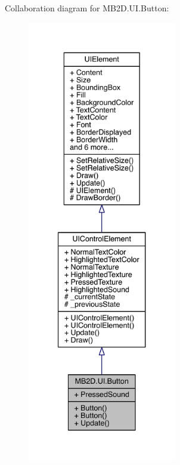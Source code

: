 Collaboration diagram for M\+B2\+D.\+U\+I.\+Button\+:\nopagebreak
\begin{figure}[H]
\begin{center}
\leavevmode
\includegraphics[height=550pt]{class_m_b2_d_1_1_u_i_1_1_button__coll__graph}
\end{center}
\end{figure}
